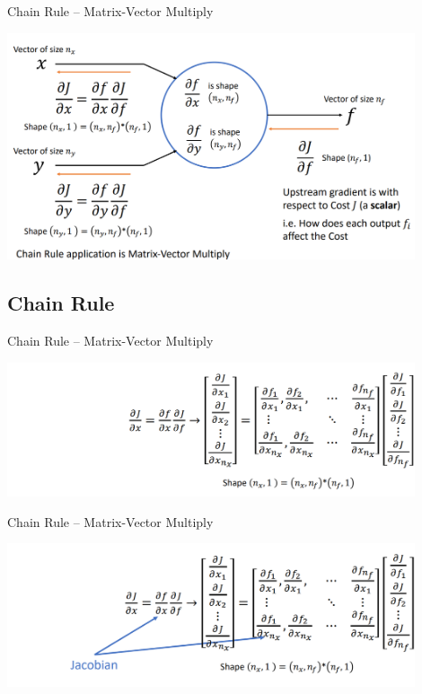\documentclass[serif, aspectratio=169]{beamer}
\begin{document}
\begin{frame}{Chain Rule – Matrix-Vector Multiply}
    \begin{center}
        \includegraphics[width=12cm]{pic/chain6.png}  
    \end{center}
\end{frame}

\subsection{Chain Rule}
\begin{frame}{Chain Rule – Matrix-Vector Multiply}
    \begin{center}
        \includegraphics[width=12cm]{pic/chain1.png}  
    \end{center}
\end{frame}

\begin{frame}{Chain Rule – Matrix-Vector Multiply}
    \begin{center}
        \includegraphics[width=12cm]{pic/chain2.png}  
    \end{center}
\end{frame}
\end{document}

